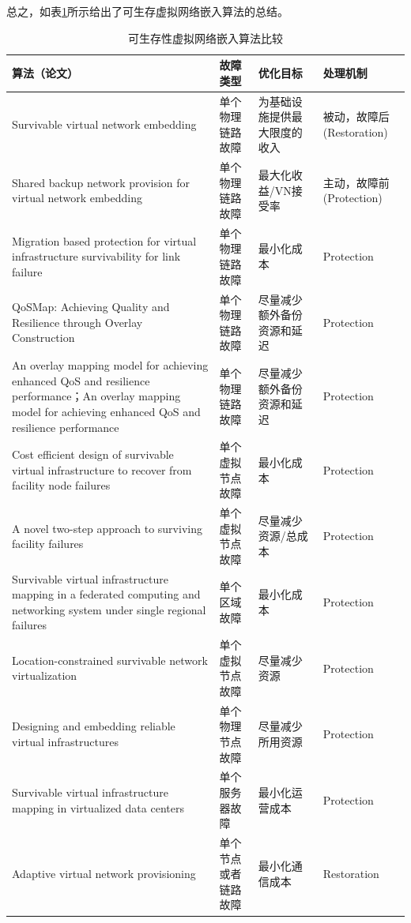 总之，如表\ref{tab:survivableVirtualNetworkEmbedd}所示给出了可生存虚拟网络嵌入算法的总结。
\begin{table}[htbp]
\caption{可生存性虚拟网络嵌入算法比较}\label{tab:survivableVirtualNetworkEmbedd}
\vspace{0.5em}\centering\wuhao
\begin{tabularx}{48em}{|*{4}{>{\centering\arraybackslash}X|}}
\toprule[1.5pt]
算法（论文）   & 故障类型  & 优化目标 & 处理机制  \\
\midrule[1pt]
Survivable virtual network embedding\cite{rahman2013svne} & 单个物理链路故障 & 为基础设施提供最大限度的收入 & 被动，故障后(Restoration)\\
\hline
Shared backup network provision for virtual network embedding\cite{guo2011shared} & 单个物理链路故障 & 最大化收益/VN接受率& 主动，故障前(Protection)\\
\hline
Migration based protection for virtual infrastructure survivability for link failure\cite{yu2011migration} & 单个物理链路故障 & 最小化成本 & Protection\\
\hline
QoSMap: Achieving Quality and Resilience through Overlay Construction\cite{shamsi2009qosmap} & 单个物理链路故障 & 尽量减少额外备份资源和延迟 & Protection\\
\hline
An overlay mapping model for achieving enhanced QoS and resilience performance\cite{zhang2011overlay}；An overlay mapping model for achieving enhanced QoS and resilience performance\cite{zhang2011overlay} & 单个物理链路故障 & 尽量减少额外备份资源和延迟 & Protection\\
\hline
Cost efficient design of survivable virtual infrastructure to recover from facility node failures\cite{yu2011cost} & 单个虚拟节点故障& 最小化成本 & Protection\\
\hline
A novel two-step approach to surviving facility failures\cite{qiao2011novel} & 单个虚拟节点故障 & 尽量减少资源/总成本 & Protection\\
\hline
Survivable virtual infrastructure mapping in a federated computing and networking system under single regional failures\cite{yu2010survivable} & 单个区域故障 & 最小化成本 & Protection \\
\hline
Location-constrained survivable network virtualization\cite{hu2012location} & 单个虚拟节点故障 & 尽量减少资源 & Protection\\
\hline
Designing and embedding reliable virtual infrastructures\cite{yeow2010designing} & 单个物理节点故障 & 尽量减少所用资源 & Protection\\
\hline
Survivable virtual infrastructure mapping in virtualized data centers\cite{xu2012survivable} & 单个服务器故障 & 最小化运营成本& Protection\\
\hline
Adaptive virtual network provisioning\cite{houidi2010adaptive} & 单个节点或者链路故障 & 最小化通信成本 & Restoration\\
\bottomrule[1.5pt]
\end{tabularx}
\vspace{\baselineskip}
\end{table}

